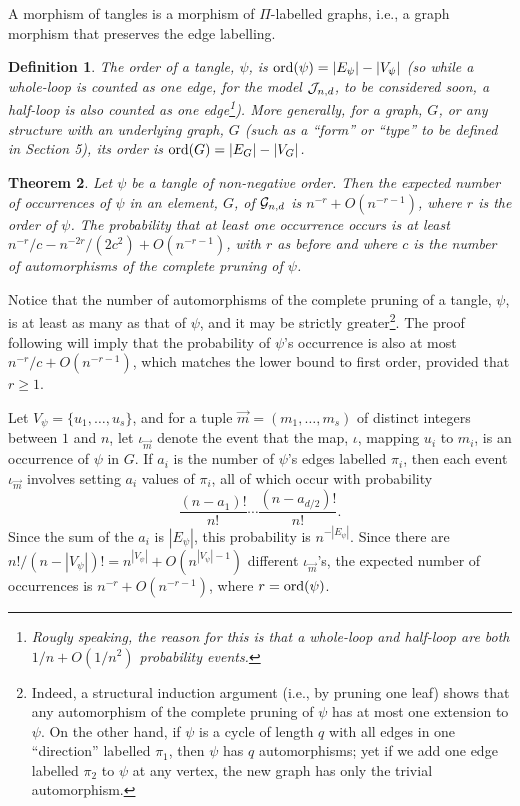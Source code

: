 \documentclass[12pt]{article}
\newtheorem{theorem}{Theorem}[section]
\newtheorem{definition}[theorem]{Definition}
\newcommand{\cg}{{\cal G}}
\newcommand{\cj}{{\cal J}}
\newcommand{\cjnd}{\cj_{n,d}}
\newcommand{\cgnd}{\cg_{n,d}}
\newcommand{\tang}{{\psi}}	%
\newcommand{\proof}{{\par\noindent {\bf Proof}\space\space}}
\begin{document}
A morphism of tangles is a morphism of $\Pi$-labelled graphs, i.e., a
graph morphism that preserves
the edge labelling.

\begin{definition}\label{de:tangle_order}
The {\em order} of a tangle, $\tang$, is 
${\rm ord}(\tang)=|E_\tang|-|V_\tang|$ (so while a whole-loop is counted as one
edge, for the model $\cjnd$, to
be considered soon, a half-loop is also counted as one edge\footnote{
  Rougly speaking, 
  the reason for this is that a whole-loop and half-loop are both
  $1/n+O(1/n^2)$ probability events.}).  More generally,
for a graph, $G$, or any structure with an underlying graph, $G$ (such as
a ``form'' or ``type'' to be defined in Section 5), its order is
${\rm ord}(G)=|E_G|-|V_G|$.
\end{definition}

\begin{theorem}\label{th:tangle_count}
Let $\tang$ be a tangle of non-negative order.
Then the expected number of occurrences
of $\tang$ in an element, $G$, of $\cgnd$
is $n^{-r}+O(n^{-r-1})$, where $r$ is the order of $\tang$.  
The probability that at least
one occurrence occurs is at least
$n^{-r}/c - n^{-2r}/(2c^2)+O(n^{-r-1})$, with $r$ as
before and where
$c$ is the number of automorphisms of the complete pruning of $\tang$.
\end{theorem}
Notice that the number of automorphisms of the complete pruning of a tangle,
$\tang$, is at least as many as that of $\tang$, and it may be strictly
greater\footnote{Indeed, a structural induction argument (i.e., by
pruning one leaf) shows that any
automorphism of the complete pruning of $\tang$
has at most one extension to $\tang$.
On the other hand, if $\tang$ is a cycle of length $q$ with all edges in one
``direction'' labelled $\pi_1$, then $\tang$ has $q$ automorphisms; yet if
we add one edge labelled $\pi_2$
to $\tang$ at any vertex, the new graph
has only the trivial automorphism.}.
The proof following will imply that the probability of $\tang$'s
occurrence is also
at most $n^{-r}/c+O(n^{-r-1})$, which matches the lower bound to first order,
provided that $r\ge 1$.
\proof 
Let $V_\tang=\{u_1,\ldots,u_s\}$, and for a tuple $\vec m=(m_1,\ldots,m_s)$
of distinct integers between $1$ and $n$, let $\iota_{\vec m}$ denote the event
that the map, $\iota$, mapping $u_i$ to $m_i$, is an occurrence of $\tang$
in $G$.
If $a_i$ is the number of $\tang$'s edges labelled $\pi_i$, then
each event $\iota_{\vec m}$ involves
setting $a_i$ values of
$\pi_i$, all of which occur
with probability
\begin{equation}\label{eq:tangle_expecteds}
\frac{(n-a_1)!}{n!}\cdots \frac{(n-a_{d/2})!}{n!}.
\end{equation}
Since the sum of the $a_i$ is $|E_\tang|$, this probability is 
$n^{-|E_\tang|}$.  
Since there are $n!/(n-|V_\tang|)!=n^{|V_\tang|}+O(n^{|V_\tang|-1})$ different 
$\iota_{\vec m}$'s,
the expected number of occurrences is $n^{-r}+O(n^{-r-1})$, where
$r={\rm ord}(\tang)$.
\end{document}
